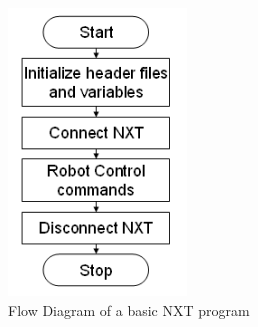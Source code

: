 \documentclass[12pt]{article}
\begin{document}
\begin{figure}[h!]
  \begin{center}
    \includegraphics[height=3in]{figure/mindstorm/NXT_pstruc.png}
    \caption{Flow Diagram of a basic NXT program\label{fig_NXT_pstruc}}
  \end{center}
\end{figure}

\newpage
\end{document}
